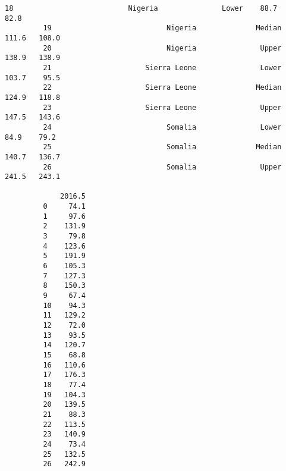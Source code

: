 \documentclass[11pt]{article}
\begin{document}
\begin{Verbatim}[commandchars=\\\{\}]
         18                           Nigeria               Lower    88.7    82.8   
         19                           Nigeria              Median   111.6   108.0   
         20                           Nigeria               Upper   138.9   138.9   
         21                      Sierra Leone               Lower   103.7    95.5   
         22                      Sierra Leone              Median   124.9   118.8   
         23                      Sierra Leone               Upper   147.5   143.6   
         24                           Somalia               Lower    84.9    79.2   
         25                           Somalia              Median   140.7   136.7   
         26                           Somalia               Upper   241.5   243.1   
         
             2016.5  
         0     74.1  
         1     97.6  
         2    131.9  
         3     79.8  
         4    123.6  
         5    191.9  
         6    105.3  
         7    127.3  
         8    150.3  
         9     67.4  
         10    94.3  
         11   129.2  
         12    72.0  
         13    93.5  
         14   120.7  
         15    68.8  
         16   110.6  
         17   176.3  
         18    77.4  
         19   104.3  
         20   139.5  
         21    88.3  
         22   113.5  
         23   140.9  
         24    73.4  
         25   132.5  
         26   242.9  
\end{Verbatim}
            
\end{document}
